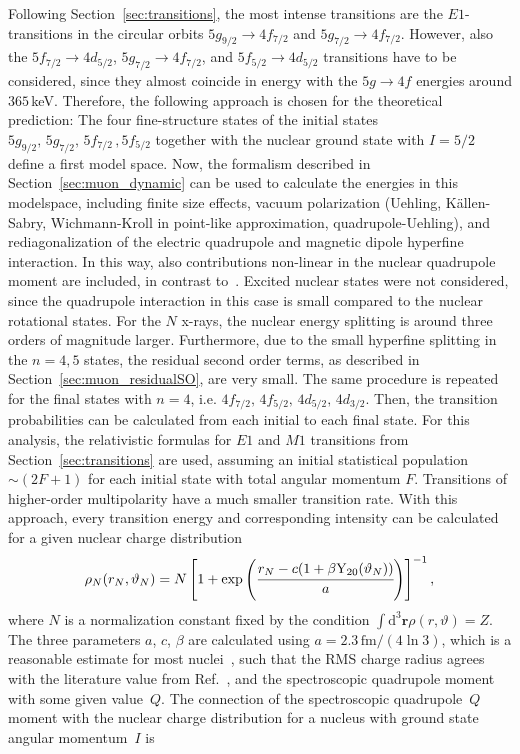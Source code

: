 Following Section~\ref{sec:transitions}, the most intense transitions are the $E1$-transitions in the circular orbits $5g_{9/2}\rightarrow4f_{7/2}$ and $5g_{7/2}\rightarrow4f_{7/2}$. However, also the $5f_{7/2}\rightarrow4d_{5/2}$, $5g_{7/2}\rightarrow 4f_{7/2}$, and $5f_{5/2}\rightarrow 4d_{5/2}$ transitions have to be considered, since they almost coincide in energy with the $5g\rightarrow4f$ energies around $365\,$keV. Therefore, the following approach is chosen for the theoretical prediction: The four fine-structure states of the initial states $5g_{9/2},\,5g_{7/2},\,5f_{7/2}\,,5f_{5/2}$ together with the nuclear ground state with $I=5/2$ define a first model space. Now, the formalism described in Section~\ref{sec:muon_dynamic} can be used to calculate the energies in this modelspace, including finite size effects, vacuum polarization (Uehling, Källen-Sabry, Wichmann-Kroll in point-like approximation, quadrupole-Uehling), and rediagonalization of the electric quadrupole and magnetic dipole hyperfine interaction. In this way, also contributions non-linear in the nuclear quadrupole moment are included, in contrast to~\cite{konijn1979}.
Excited nuclear states were not considered, since the quadrupole interaction in this case is small compared to the nuclear rotational states. For the $N$ x-rays, the nuclear energy splitting is around three orders of magnitude larger. Furthermore, due to the small hyperfine splitting in the ${n}{=}{4,5}$ states, the residual second order terms, as described in Section~\ref{sec:muon_residualSO}, are very small.
The same procedure is repeated for the final states with ${n}{=}{4}$, i.e. $4f_{7/2},\,4f_{5/2},\,4d_{5/2},\,4d_{3/2}$.
Then, the transition probabilities can be calculated from each initial to each final state. For this analysis, the relativistic formulas for $E1$ and $M1$ transitions from Section~\ref{sec:transitions} are used, assuming an initial statistical population $\sim (2F+1)$ for each initial state with total angular momentum $F$. Transitions of higher-order multipolarity have a much smaller transition rate. With this approach, every transition energy and corresponding intensity can be calculated for a given nuclear charge distribution
\begin{equation}
\rho_N(r_N,\vartheta_N)=N\left[1+\exp\left(\cfrac{r_N-c(1+\beta \text{Y}_{20}(\vartheta_N))}{a}\right)\right]^{-1},
\end{equation}
where $N$ is a normalization constant fixed by the condition $\int\text{d}^3\mathbf{r} \rho(r,\vartheta) = Z$.
The three parameters $a$, $c$, $\beta$ are calculated using $a=2.3\,\text{fm}/(4\ln3)$, which is a reasonable estimate for most nuclei~\cite{Beier2000}, such that the RMS charge radius agrees with the literature value from Ref.~\cite{Angeli2013}, and the spectroscopic quadrupole moment with some given value~$Q$. The connection of the spectroscopic quadrupole~$Q$ moment with the nuclear charge distribution for a nucleus with ground state angular momentum~$I$ is
